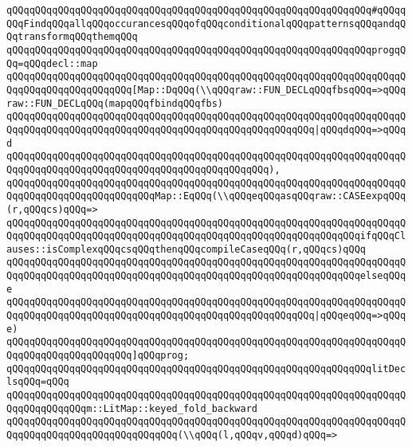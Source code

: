 \newline
\verb|qQQqqQQqqQQqqQQqqQQqqQQqqQQqqQQqqQQqqQQqqQQqqQQqqQQqqQQqqQQqqQQq#qQQqqQQqFindqQQqallqQQqoccurancesqQQqofqQQqconditionalqQQqpatternsqQQqandqQQqtransformqQQqthemqQQq|\newline
\verb|qQQqqQQqqQQqqQQqqQQqqQQqqQQqqQQqqQQqqQQqqQQqqQQqqQQqqQQqqQQqqQQqprogqQQq=qQQqdecl::map|\newline
\verb|qQQqqQQqqQQqqQQqqQQqqQQqqQQqqQQqqQQqqQQqqQQqqQQqqQQqqQQqqQQqqQQqqQQqqQQqqQQqqQQqqQQqqQQqqQQq[Map::DqQQq(\\qQQqraw::FUN_DECLqQQqfbsqQQq=>qQQqraw::FUN_DECLqQQq(mapqQQqfbindqQQqfbs)|\newline
\verb|qQQqqQQqqQQqqQQqqQQqqQQqqQQqqQQqqQQqqQQqqQQqqQQqqQQqqQQqqQQqqQQqqQQqqQQqqQQqqQQqqQQqqQQqqQQqqQQqqQQqqQQqqQQqqQQqqQQqqQQqqQQq|\verb#|qQQqdqQQq=>qQQqd#\newline
\verb|qQQqqQQqqQQqqQQqqQQqqQQqqQQqqQQqqQQqqQQqqQQqqQQqqQQqqQQqqQQqqQQqqQQqqQQqqQQqqQQqqQQqqQQqqQQqqQQqqQQqqQQqqQQqqQQqqQQq),|\newline
\verb|qQQqqQQqqQQqqQQqqQQqqQQqqQQqqQQqqQQqqQQqqQQqqQQqqQQqqQQqqQQqqQQqqQQqqQQqqQQqqQQqqQQqqQQqqQQqqQQqMap::EqQQq(\\qQQqeqQQqasqQQqraw::CASEexpqQQq(r,qQQqcs)qQQq=>|\newline
\verb|qQQqqQQqqQQqqQQqqQQqqQQqqQQqqQQqqQQqqQQqqQQqqQQqqQQqqQQqqQQqqQQqqQQqqQQqqQQqqQQqqQQqqQQqqQQqqQQqqQQqqQQqqQQqqQQqqQQqqQQqqQQqqQQqqQQqifqQQqClauses::isComplexqQQqcsqQQqthenqQQqcompileCaseqQQq(r,qQQqcs)qQQq|\newline
\verb|qQQqqQQqqQQqqQQqqQQqqQQqqQQqqQQqqQQqqQQqqQQqqQQqqQQqqQQqqQQqqQQqqQQqqQQqqQQqqQQqqQQqqQQqqQQqqQQqqQQqqQQqqQQqqQQqqQQqqQQqqQQqqQQqqQQqelseqQQqe|\newline
\verb|qQQqqQQqqQQqqQQqqQQqqQQqqQQqqQQqqQQqqQQqqQQqqQQqqQQqqQQqqQQqqQQqqQQqqQQqqQQqqQQqqQQqqQQqqQQqqQQqqQQqqQQqqQQqqQQqqQQqqQQqqQQq|\verb#|qQQqeqQQq=>qQQqe)#\newline
\verb|qQQqqQQqqQQqqQQqqQQqqQQqqQQqqQQqqQQqqQQqqQQqqQQqqQQqqQQqqQQqqQQqqQQqqQQqqQQqqQQqqQQqqQQqqQQq]qQQqprog;|\newline
\newline
\verb|qQQqqQQqqQQqqQQqqQQqqQQqqQQqqQQqqQQqqQQqqQQqqQQqqQQqqQQqqQQqqQQqlitDeclsqQQq=qQQq|\newline
\verb|qQQqqQQqqQQqqQQqqQQqqQQqqQQqqQQqqQQqqQQqqQQqqQQqqQQqqQQqqQQqqQQqqQQqqQQqqQQqqQQqqQQqm::LitMap::keyed_fold_backward|\newline
\verb|qQQqqQQqqQQqqQQqqQQqqQQqqQQqqQQqqQQqqQQqqQQqqQQqqQQqqQQqqQQqqQQqqQQqqQQqqQQqqQQqqQQqqQQqqQQqqQQqqQQq(\\qQQq(l,qQQqv,qQQqd)qQQq=>|\newline
